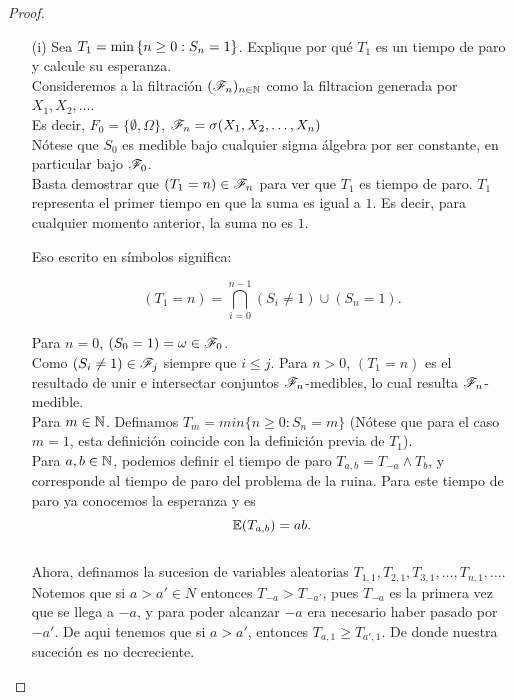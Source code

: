 \begin{proof}
	\begin{enumerate}
		\item[(i)]
		Sea $T_1=\min\left\{ n\geq 0:S_n=1\right\} $. Explique por qu\'e $T_1$ es un 
		tiempo de paro y calcule su esperanza.\\
		
			Consideremos a la filtración $(\mathscr{F}_n)_{n\in\mathbb{N}}$ como la filtracion 
			generada por $X_1, X_2, \dots$.\\

			Es decir, $F_0 = \{\emptyset, \Omega\}$, $\mathscr{F}_n = \sigma(X_1, X_2, \dots, X_n)$\\
		
			Nótese que $S_0$ es medible bajo cualquier sigma álgebra por ser constante, en particular bajo
			$\mathscr{F}_0$.\\
		
			Basta demostrar que $(T_1 = n) \in \mathscr{F}_n$ para ver que $T_1$ es tiempo de paro. $T_1$ 
			representa el primer tiempo en que la suma es igual a $1$. Es decir, para cualquier 
			momento anterior, la suma no es $1$.
		
			Eso escrito en símbolos significa:
		
			$$(T_1 = n) = \bigcap_{i=0}^{n-1}(S_i \not= 1) \cup (S_n = 1).$$ 
		
			Para $n=0$, $(S_0 = 1) = \omega \in \mathscr{F}_0$. \\
		
			Como $(S_i \not= 1) \in \mathscr{F}_j$ siempre que $i \leq j$. Para $n>0$, $(T_1 = n)$ es el resultado de 
			unir e intersectar conjuntos $\mathscr{F}_n$-medibles, lo cual resulta $\mathscr{F}_n$-medible.\\
		
			Para $m \in \mathbb{N}$. Definamos $T_m = min\{n \geq 0 : S_n = m\}$ 
			(Nótese que para el caso $m=1$, esta definición	coincide con la definición previa de $T_1$).\\
			
			Para $a,b \in \mathbb{N}$, podemos definir el tiempo de paro $T_{a,b} = T_{-a} \wedge T_b$, y 
			corresponde al 	tiempo de paro del problema de la ruina. Para este tiempo de paro ya conocemos 
			la esperanza y es
			$$\mathbb{E}(T_{a,b}) = ab.$$\\
			
			Ahora, definamos la sucesion de variables aleatorias $T_{1,1}, T_{2,1}, T_{3,1}, \dots, T_{n,1}, 
			\dots$. Notemos que si $a>a' \in N$ entonces $T_{-a} > T_{-a'}$, pues $T_{-a}$ es la primera vez
			que se llega a $-a$, y para poder alcanzar $-a$ era necesario haber pasado por $-a'$.
			De aqui tenemos que si $a>a'$, entonces $T_{a,1} \geq T_{a',1}$. De donde nuestra suceción es 
			no decreciente.\\
			

\end{enumerate}
\end{proof}
